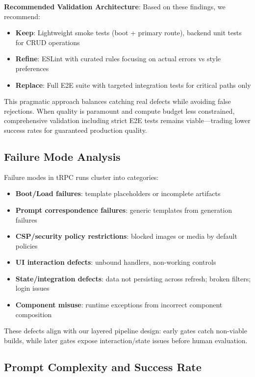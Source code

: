 \documentclass[11pt]{article}
\begin{document}
\textbf{Recommended Validation Architecture}:
Based on these findings, we recommend:
\begin{itemize}
\item \textbf{Keep}: Lightweight smoke tests (boot + primary route), backend unit tests for CRUD operations
\item \textbf{Refine}: ESLint with curated rules focusing on actual errors vs style preferences
\item \textbf{Replace}: Full E2E suite with targeted integration tests for critical paths only
\end{itemize}

This pragmatic approach balances catching real defects while avoiding false rejections. When quality is paramount and compute budget less constrained, comprehensive validation including strict E2E tests remains viable—trading lower success rates for guaranteed production quality.

\subsection{Failure Mode Analysis}

Failure modes in tRPC runs cluster into categories:

\begin{itemize}
\item \textbf{Boot/Load failures}: template placeholders or incomplete artifacts
\item \textbf{Prompt correspondence failures}: generic templates from generation failures
\item \textbf{CSP/security policy restrictions}: blocked images or media by default policies
\item \textbf{UI interaction defects}: unbound handlers, non-working controls
\item \textbf{State/integration defects}: data not persisting across refresh; broken filters; login issues
\item \textbf{Component misuse}: runtime exceptions from incorrect component composition
\end{itemize}

These defects align with our layered pipeline design: early gates catch non-viable builds, while later gates expose interaction/state issues before human evaluation.

\subsection{Prompt Complexity and Success Rate}
\label{sec:prompt-complexity}
\end{document}
